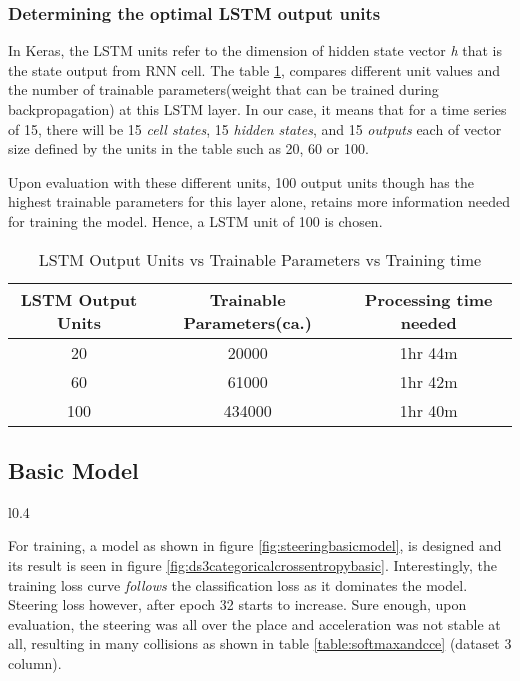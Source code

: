 \subsubsection*{Determining the optimal LSTM output units}
In Keras, the LSTM units refer to the dimension of hidden state vector \textit{h} that is the state output from RNN cell.
The table \ref{table:unitsvstime}, compares different unit values and the number of
trainable parameters(weight that can be trained during backpropagation) at this LSTM
layer.
In our case, it means that for a time series of 15, there will be 15 \textit{cell states},
15 \textit{hidden states}, and 15 \textit{outputs} each of vector size defined by the
units in the table such as 20, 60 or 100.

Upon evaluation with these different units, 100 output units though has the highest
trainable parameters for this layer alone, retains more information needed for training
the model.  Hence, a LSTM unit of 100 is chosen.
\begin{table}[h]
    \centering
\begin{tabular}{ccc}
    \toprule
    LSTM Output Units & Trainable Parameters(ca.) & Processing time needed \\\midrule
    20 & 20000 & 1hr 44m  \\
    60 & 61000 & 1hr 42m \\
    100 & 434000  & 1hr 40m \\\bottomrule
\end{tabular}
\caption{LSTM Output Units vs Trainable Parameters vs Training time}
\label{table:unitsvstime}
\end{table}
\newpage
\subsection{Basic Model}
\begin{wrapfigure}{l}{0.4\textwidth}
	\centering
    \def\svgwidth{0.4\textwidth}
    \caption{Basic model}
    \label{fig:steeringbasicmodel}
\end{wrapfigure}

For training, a model as shown in figure \ref{fig:steeringbasicmodel}, is designed and its
result is seen in figure \ref{fig:ds3categoricalcrossentropybasic}. Interestingly, the
training loss curve \textit{follows} the classification loss as it dominates the model. Steering
loss however, after epoch 32 starts to increase. Sure enough, upon evaluation,
the steering was all over the place and acceleration was not stable at all, resulting in
many collisions as shown in table \ref{table:softmaxandcce} (dataset 3 column).

